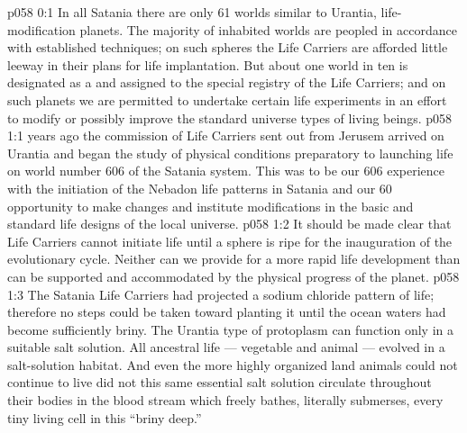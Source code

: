 \author{Life Carrier}
\vs p058 0:1 In all Satania there are only 61 worlds similar to Urantia, life\hyp{}modification planets. The majority of inhabited worlds are peopled in accordance with established techniques; on such spheres the Life Carriers are afforded little leeway in their plans for life implantation. But about one world in ten is designated as a  and assigned to the special registry of the Life Carriers; and on such planets we are permitted to undertake certain life experiments in an effort to modify or possibly improve the standard universe types of living beings.
\vs p058 1:1  years ago the commission of Life Carriers sent out from Jerusem arrived on Urantia and began the study of physical conditions preparatory to launching life on world number 606 of the Satania system. This was to be our 606 experience with the initiation of the Nebadon life patterns in Satania and our 60 opportunity to make changes and institute modifications in the basic and standard life designs of the local universe.
\vs p058 1:2 \pc It should be made clear that Life Carriers cannot initiate life until a sphere is ripe for the inauguration of the evolutionary cycle. Neither can we provide for a more rapid life development than can be supported and accommodated by the physical progress of the planet.
\vs p058 1:3 The Satania Life Carriers had projected a sodium chloride pattern of life; therefore no steps could be taken toward planting it until the ocean waters had become sufficiently briny. The Urantia type of protoplasm can function only in a suitable salt solution. All ancestral life --- vegetable and animal --- evolved in a salt\hyp{}solution habitat. And even the more highly organized land animals could not continue to live did not this same essential salt solution circulate throughout their bodies in the blood stream which freely bathes, literally submerses, every tiny living cell in this “briny deep.”
